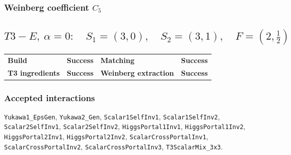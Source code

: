 \documentclass[10pt]{article}
\begin{document}
\subsubsection*{Weinberg coefficient $C_5$}
\noindent{}\par
\smallskip
\clearpage
\subsection*{$T3-E,\ \alpha=0:\quad S_1=(3,0),\quad S_2=(3,1),\quad F=(2,\frac{1}{2})$}
\begin{center}
\begin{tabular}{>{\bfseries}l l >{\bfseries}l l}
\toprule
Build & \textbf{Success} & Matching & \textbf{Success} \\
T3 ingredients & \textbf{Success} & Weinberg extraction & \textbf{Success} \\
\bottomrule
\end{tabular}
\end{center}
\subsubsection*{Accepted interactions}
\texttt{Yukawa1\_EpsGen}, \texttt{Yukawa2\_Gen}, \texttt{Scalar1SelfInv1}, \texttt{Scalar1SelfInv2}, \texttt{Scalar2SelfInv1}, \texttt{Scalar2SelfInv2}, \texttt{HiggsPortal1Inv1}, \texttt{HiggsPortal1Inv2}, \texttt{HiggsPortal2Inv1}, \texttt{HiggsPortal2Inv2}, \texttt{ScalarCrossPortalInv1}, \texttt{ScalarCrossPortalInv2}, \texttt{ScalarCrossPortalInv3}, \texttt{T3ScalarMix\_3x3}.
\end{document}
